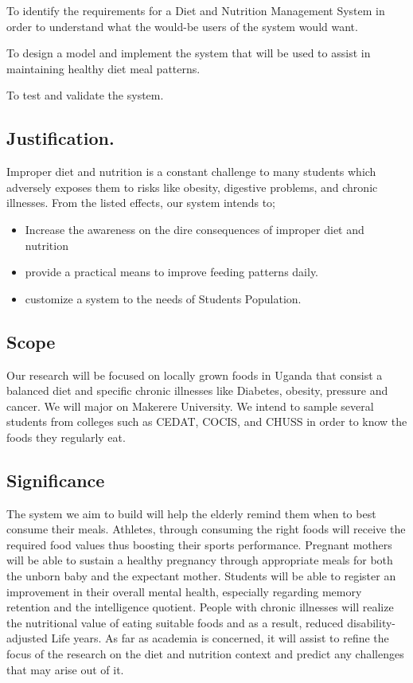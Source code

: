 \documentclass{article}
\begin{document}
To identify the requirements for a Diet and Nutrition Management System in order to understand what the would-be users of the system would want.

To design a model and implement the system that will be used to assist in maintaining healthy diet meal patterns.

To test and validate the system.  

\subsection{Justification.}
Improper diet and nutrition is a constant challenge to many students which adversely exposes them to risks like obesity, digestive problems, and chronic illnesses. From the listed effects, our system intends to; 
\begin{itemize}
  \item Increase the awareness on the dire consequences of improper diet and nutrition
  \item provide a practical means to improve feeding patterns daily. 
  \item customize a system to the needs of Students Population. 

\end{itemize}

\subsection{Scope}
Our research will be focused on locally grown foods in Uganda that consist a balanced diet and specific chronic illnesses like Diabetes, obesity, pressure and cancer. We will major on Makerere University. We intend to sample several students from colleges such as CEDAT, COCIS, and CHUSS in order to know the foods they regularly eat.

\subsection{Significance}
The system we aim to build will help the elderly remind them when to best consume their meals. Athletes, through consuming the right foods will receive the required food values thus boosting their sports performance. Pregnant mothers will be able to sustain a healthy pregnancy through appropriate meals for both the unborn baby and the expectant mother. Students will be able to register an improvement in their overall mental health, especially regarding memory retention and the intelligence quotient.  People with chronic illnesses will realize the nutritional value of eating suitable foods and as a result, reduced disability-adjusted Life years. As far as academia is concerned, it will assist to refine the focus of the research on the diet and nutrition context and predict any challenges that may arise out of it.
\end{document}

